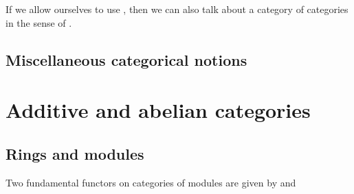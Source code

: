 

If we allow ourselves to use , then we can also talk about a category of categories in the sense of .

\subsection{Miscellaneous categorical notions}



\section{Additive and abelian categories}

\subsection{Rings and modules}












Two fundamental functors on categories of modules are given by  and 







